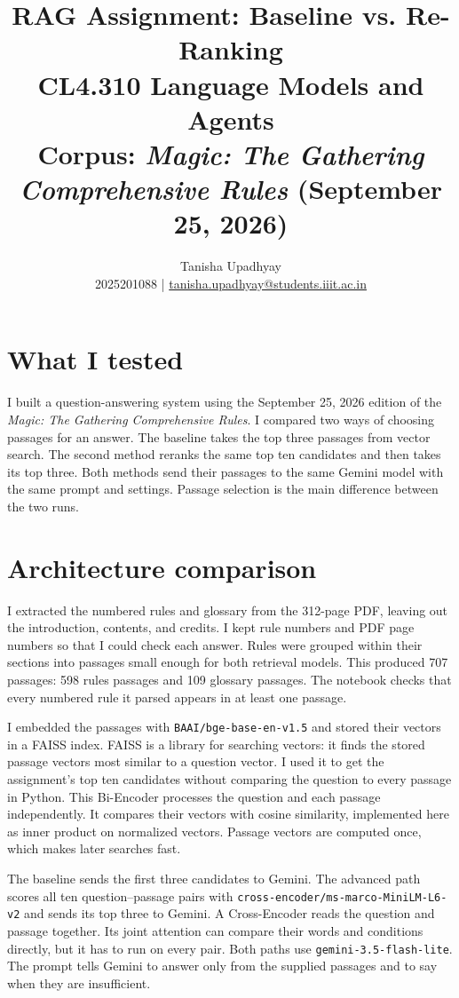 \documentclass[11pt,a4paper]{article}
\title{RAG Assignment: Baseline vs. Re-Ranking\\[0.4em]
\large CL4.310 Language Models and Agents\\[0.2em]
\normalsize Corpus: \emph{Magic: The Gathering Comprehensive Rules} (September 25, 2026)}
\author{Tanisha Upadhyay\\2025201088 \;|\; \href{mailto:tanisha.upadhyay@students.iiit.ac.in}{tanisha.upadhyay@students.iiit.ac.in}}
\date{}
\begin{document}
\maketitle
\vspace{-2.5em}

\section*{What I tested}
I built a question-answering system using the September 25, 2026 edition of the \emph{Magic: The Gathering Comprehensive Rules}. I compared two ways of choosing passages for an answer. The baseline takes the top three passages from vector search. The second method reranks the same top ten candidates and then takes its top three. Both methods send their passages to the same Gemini model with the same prompt and settings. Passage selection is the main difference between the two runs.

\section*{Architecture comparison}
I extracted the numbered rules and glossary from the 312-page PDF, leaving out the introduction, contents, and credits. I kept rule numbers and PDF page numbers so that I could check each answer. Rules were grouped within their sections into passages small enough for both retrieval models. This produced 707 passages: 598 rules passages and 109 glossary passages. The notebook checks that every numbered rule it parsed appears in at least one passage.

I embedded the passages with \texttt{BAAI/bge-base-en-v1.5} and stored their vectors in a FAISS index. FAISS is a library for searching vectors: it finds the stored passage vectors most similar to a question vector. I used it to get the assignment's top ten candidates without comparing the question to every passage in Python. This Bi-Encoder processes the question and each passage independently. It compares their vectors with cosine similarity, implemented here as inner product on normalized vectors. Passage vectors are computed once, which makes later searches fast.

The baseline sends the first three candidates to Gemini. The advanced path scores all ten question--passage pairs with \texttt{cross-encoder/ms-marco-MiniLM-L6-v2} and sends its top three to Gemini. A Cross-Encoder reads the question and passage together. Its joint attention can compare their words and conditions directly, but it has to run on every pair. Both paths use \texttt{gemini-3.5-flash-lite}. The prompt tells Gemini to answer only from the supplied passages and to say when they are insufficient.
\end{document}
